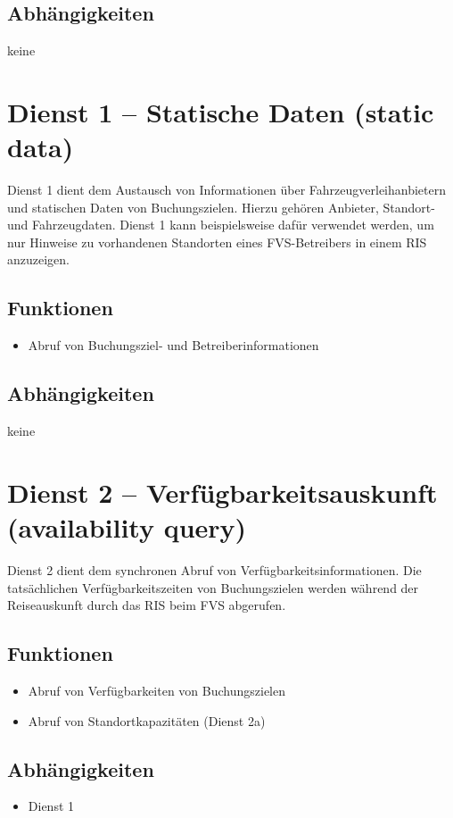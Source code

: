\subsection*{Abhängigkeiten}
keine


\section{Dienst 1 -- Statische Daten (static data)}
\label{sec:Hierachiemodell:Dienst1}

Dienst 1 dient dem Austausch von Informationen über Fahrzeugverleihanbietern und statischen Daten von Buchungszielen. Hierzu gehören Anbieter, Standort- und Fahrzeugdaten. Dienst 1 kann beispielsweise dafür verwendet werden, um nur Hinweise zu vorhandenen Standorten eines FVS-Betreibers in einem RIS anzuzeigen.

\subsection*{Funktionen}
\begin{itemize}
\item Abruf von Buchungsziel- und Betreiberinformationen
\end{itemize}

\subsection*{Abhängigkeiten}
keine

\section{Dienst 2 -- Verfügbarkeitsauskunft (availability query) }
\label{sec:Hierachiemodell:Dienst2}
Dienst 2 dient dem synchronen Abruf von Verfügbarkeitsinformationen. Die tatsächlichen Verfügbarkeitszeiten von Buchungszielen werden während der Reiseauskunft durch das RIS beim FVS abgerufen.

\subsection*{Funktionen}
\begin{itemize}
\item Abruf von Verfügbarkeiten von Buchungszielen
\item Abruf von Standortkapazitäten (Dienst 2a)
\end{itemize}

\subsection*{Abhängigkeiten}
\begin{itemize}
\item Dienst 1
\end{itemize}

